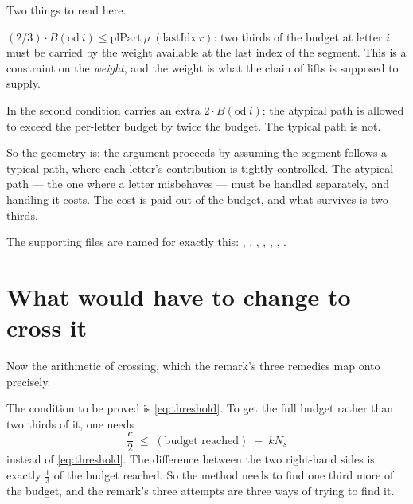 Two things to read here.

\begin{description}[style=nextline,leftmargin=0pt,labelwidth=0pt,labelsep=0pt,font=\sffamily\bfseries\small,
  itemsep=6pt]
\item[Both paths carry the same two-thirds requirement.]
$(2/3)\cdot B(\mathrm{od}\ i) \le \mathrm{plPart}\ \mu\ (\mathrm{lastIdx}\ r)$:
two thirds of the budget at letter $i$ must be carried by the weight
available at the last index of the segment. This is a constraint on the
\emph{weight}, and the weight is what the chain of lifts is supposed to
supply.
\item[The atypical path gets slack, and it is exactly the slack that is
missing elsewhere.] In  the second condition carries an extra
$2\cdot B(\mathrm{od}\ i)$: the atypical path is allowed to exceed the
per-letter budget  by twice the budget. The typical path is not.

So the geometry is: the argument proceeds by assuming the segment follows a
typical path, where each letter's contribution is tightly controlled. The
atypical path --- the one where a letter misbehaves --- must be handled
separately, and handling it costs. The cost is paid out of the budget, and
what survives is two thirds.
\end{description}

The supporting files are named for exactly this: ,
, ,
, ,
, .

\section{What would have to change to cross it}Now the arithmetic of crossing, which the remark's three remedies map onto
precisely.

The condition to be proved is \eqref{eq:threshold}. To get the full budget
rather than two thirds of it, one needs
\begin{equation}
\frac{c}{2} \;\le\; (\text{budget reached}) \;-\; k N_s
\label{eq:thresholdfull}
\end{equation}
instead of \eqref{eq:threshold}. The difference between the two right-hand
sides is exactly $\tfrac13$ of the budget reached. So the method needs to find
one third more of the budget, and the remark's three attempts are three ways
of trying to find it.

